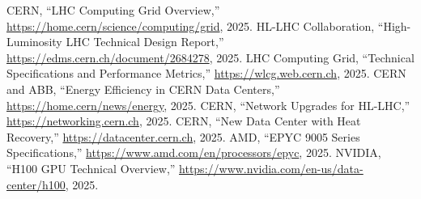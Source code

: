 \documentclass[a4paper,11pt]{article}
\begin{document}
\begin{thebibliography}{9}
CERN, ``LHC Computing Grid Overview,'' \url{https://home.cern/science/computing/grid}, 2025.
HL-LHC Collaboration, ``High-Luminosity LHC Technical Design Report,'' \url{https://edms.cern.ch/document/2684278}, 2025.
LHC Computing Grid, ``Technical Specifications and Performance Metrics,'' \url{https://wlcg.web.cern.ch}, 2025.
CERN and ABB, ``Energy Efficiency in CERN Data Centers,'' \url{https://home.cern/news/energy}, 2025.
CERN, ``Network Upgrades for HL-LHC,'' \url{https://networking.cern.ch}, 2025.
CERN, ``New Data Center with Heat Recovery,'' \url{https://datacenter.cern.ch}, 2025.
AMD, ``EPYC 9005 Series Specifications,'' \url{https://www.amd.com/en/processors/epyc}, 2025.
NVIDIA, ``H100 GPU Technical Overview,'' \url{https://www.nvidia.com/en-us/data-center/h100}, 2025.
\end{thebibliography}
\end{document}
